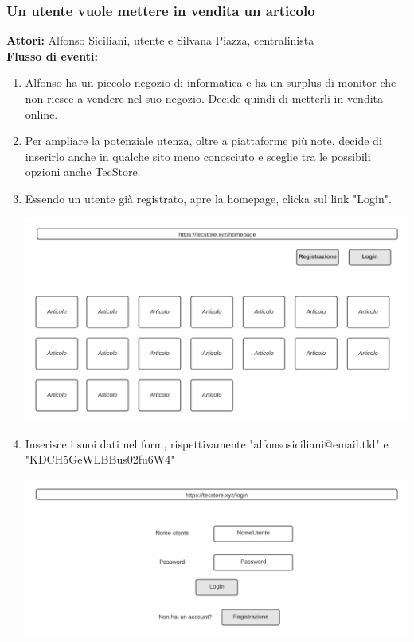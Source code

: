 \documentclass[12pt,a4paper]{article}
\begin{document}
\subsubsection{Un utente vuole mettere in vendita un articolo}
\textbf{Attori:} Alfonso Siciliani, utente e Silvana Piazza, centralinista \\

\noindent
\textbf{Flusso di eventi:}

\begin{enumerate}

\item Alfonso ha un piccolo negozio di informatica e ha un surplus di monitor che non riesce a vendere nel suo negozio. Decide quindi di metterli in vendita online.

\item Per ampliare la potenziale utenza, oltre a piattaforme più note, decide di inserirlo anche in qualche sito meno conosciuto e sceglie tra le possibili opzioni anche TecStore.
\newpage

\item Essendo un utente già registrato, apre la homepage, clicka sul link "Login".

\includegraphics[width=\textwidth]{Mockup/homepage}

\item Inserisce i suoi dati nel form, rispettivamente "alfonsosiciliani@email.tld" e "KDCH5GeWLBBus02fu6W4"

\includegraphics[width=\textwidth]{Mockup/login}


\end{enumerate}
\end{document}
